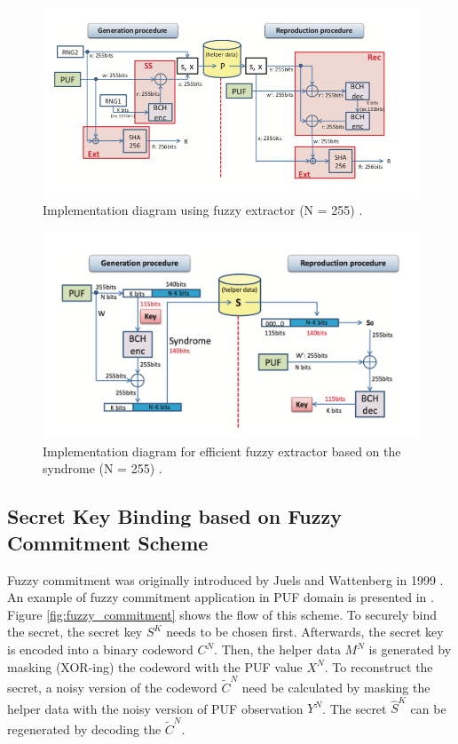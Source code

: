\begin{figure}[tph!]
    \centerline{\includegraphics[width={\textwidth}]{images/crypt_key_generation_old}}
    \caption{Implementation diagram using fuzzy extractor (N = 255) \cite{cryptographic_key_generation_old}.}
    \label{fig:cryptographic_key_generation_old}
\end{figure}

\begin{figure}[tph!]
    \centerline{\includegraphics[width={\textwidth}]{images/crypt_key_generation}}
    \caption{Implementation diagram for efficient fuzzy extractor based on the syndrome (N = 255) \cite{cryptographic_key_generation}.}
    \label{fig:cryptographic_key_generation}
\end{figure}

\subsection{Secret Key Binding based on Fuzzy Commitment Scheme}
Fuzzy commitment was originally introduced by Juels and Wattenberg in 1999 \cite{Juels:1999:FCS:319709.319714}. An example of fuzzy commitment application in PUF domain is presented in \cite{8006840}. Figure \ref{fig:fuzzy_commitment} shows the flow of this scheme.
To securely bind the secret, the secret key $S^K$ needs to be chosen first. Afterwards, the secret key is encoded into a binary codeword $C^N$. Then, the helper data $M^N$ is generated by masking (XOR-ing) the codeword with the PUF value $X^N$.
To reconstruct the secret, a noisy version of the codeword $\widetilde{C}^N$ need be calculated by masking the helper data with the noisy version of PUF observation $Y^N$. The secret $\widehat{S}^K$ can be regenerated by decoding the $\widetilde{C}^N$.

